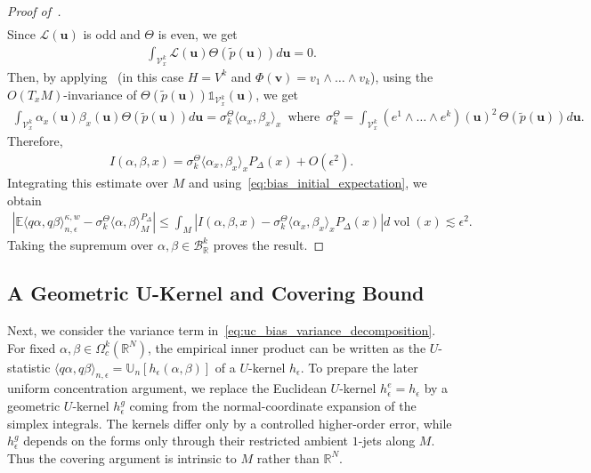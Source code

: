\documentclass[11pt,reqno]{amsproc}
\numberwithin{equation}{section}
\newcommand{\R}{\mathbb{R}}
\newcommand{\E}{\mathbb{E}}
\newcommand{\U}{\mathbb{U}}
\newcommand{\one}{\mathbb{1}}
\newcommand{\bu}{\mathbf{u}}
\newcommand{\bv}{\mathbf{v}}
\newcommand{\cB}{\mathcal{B}}
\newcommand{\cL}{\mathcal{L}}
\newcommand{\cV}{\mathcal{V}}
\newcommand{\tp}{\tilde{p}}
\newcommand{\ls}{\lesssim}
\newcommand{\vol}{\operatorname{vol}}
\newcommand{\dvol}{d\!\vol}
\theoremstyle{definition}
\theoremstyle{plain}
\begin{document}
\begin{proof}[Proof of~]
\begin{align}
        \end{align}
        Since $\cL(\bu)$ is odd and $\Theta$ is even, we get
        \begin{align}
            \int_{\cV_x^k} \cL(\bu) \Theta(\tp(\bu)) d\bu  = 0.
        \end{align}
        Then, by applying~ (in this case $H = V^k$ and $\Phi(\bv) = v_1 \wedge \ldots \wedge v_k$), using the $O(T_x M)$-invariance of $\Theta(\tp(\bu)) \one_{\cV_x^k}(\bu)$, we get
        \begin{align}
            \int_{\cV_x^k} \alpha_x(\bu) \beta_x(\bu) \Theta(\tp(\bu))  d\bu = \sigma^\Theta_k \langle \alpha_x, \beta_x \rangle_x \hspace{6pt} \text{where} \hspace{6pt} \sigma^\Theta_k = \int_{\cV_x^k} (e^1 \wedge \ldots \wedge  e^k)(\bu)^2 \, \Theta(\tp(\bu)) d\bu.
        \end{align}
        Therefore,
        \begin{align}
            I(\alpha, \beta, x) =  \sigma^\Theta_k \langle \alpha_x, \beta_x \rangle_x  P_\Delta(x) + O(\epsilon^{2}).
        \end{align}
        Integrating this estimate over $M$ and using~\eqref{eq:bias_initial_expectation}, we obtain
        \begin{align}
            \left|\E\langle q\alpha,q\beta\rangle_{n,\epsilon}^{\kappa,w}-\sigma_k^\Theta\langle\alpha,\beta\rangle_M^{P_\Delta}\right|
            \leq \int_M\left|I(\alpha,\beta,x)-\sigma_k^\Theta\langle\alpha_x,\beta_x\rangle_xP_\Delta(x)\right|\dvol(x)\ls\epsilon^2.
        \end{align}
        Taking the supremum over $\alpha,\beta\in\cB_\R^k$ proves the result.
    \end{proof}



    \subsection{A Geometric U-Kernel and Covering Bound} \label{ssec:uc_geometric_kernel}

    Next, we consider the variance term in~\eqref{eq:uc_bias_variance_decomposition}. For fixed $\alpha,\beta\in\Omega^k_c(\R^N)$, the empirical inner product can be written as the $U$-statistic $\langle q\alpha, q\beta \rangle_{n, \epsilon} = \U_n[h_\epsilon(\alpha, \beta)]$ of a $U$-kernel $h_\epsilon$. To prepare the later uniform concentration argument, we replace the Euclidean $U$-kernel $h^e_\epsilon=h_\epsilon$ by a geometric $U$-kernel $h^g_\epsilon$ coming from the normal-coordinate expansion of the simplex integrals. 
    The kernels differ only by a controlled higher-order error, while $h^g_\epsilon$ depends on the forms only through their restricted ambient $1$-jets along $M$. Thus the covering argument is intrinsic to $M$ rather than $\R^N$.\medskip
    
\end{document}
